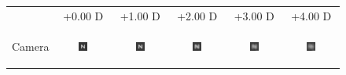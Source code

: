 
\begin{figure}[!t]
	\centering
	
	\begin{tabular}{@{}r@{ } c@{ } c@{ } c@{ } c@{ } c }
	&
	\small{+0.00 D} &
	\small{+1.00 D} &
	\small{+2.00 D} &
	\small{+3.00 D} &
	\small{+4.00 D} & \\

	\begin{sideways} \parbox[b]{20mm} {Camera} \end{sideways} &
	\includegraphics[width=0.185\textwidth]{__Images/05/BW_N(20-200)_+0D_to_+4D/bw_N_20-200_Camera+0,00D(lens).png} &
	\includegraphics[width=0.185\textwidth]{__Images/05/BW_N(20-200)_+0D_to_+4D/bw_N_20-200_Camera+1,00D(lens).png} &
	\includegraphics[width=0.185\textwidth]{__Images/05/BW_N(20-200)_+0D_to_+4D/bw_N_20-200_Camera+2,00D(lens).png} &
	\includegraphics[width=0.185\textwidth]{__Images/05/BW_N(20-200)_+0D_to_+4D/bw_N_20-200_Camera+3,00D(lens).png} &
	\includegraphics[width=0.185\textwidth]{__Images/05/BW_N(20-200)_+0D_to_+4D/bw_N_20-200_Camera+4,00D(lens).png} \\


\end{tabular}
\end{figure}
